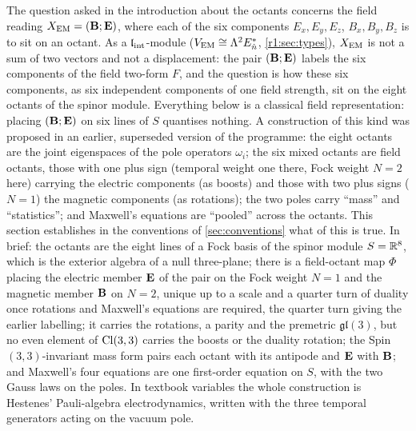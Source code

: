 The question asked in the introduction about the octants concerns the field reading $X_{\rm EM}=(\mathbf B;\mathbf E)$, where each of the six components
$E_x,E_y,E_z$, $B_x,B_y,B_z$ is to sit on an octant. As a $\mathfrak l_{\rm int}$-module ($V_{\rm EM}\cong\Lambda^2E_{\hat n}^*$, \cref{r1:sec:types}), $X_{\rm EM}$ is not a sum
of two vectors and not a displacement: the pair $(\mathbf B;\mathbf E)$ labels the six components of the field two-form $F$, and the question is how
these six components, as six independent components of one field strength, sit on the eight octants of the spinor module. Everything below
is a classical field representation: placing $(\mathbf B;\mathbf E)$ on six lines of $S$ quantises nothing. A construction of this kind was proposed in an earlier, superseded version of the programme: the eight octants are the joint
eigenspaces of the pole operators $\omega_i$; the six mixed octants are field octants, those with one plus sign (temporal weight one
there, Fock weight $N=2$ here) carrying the electric components (as boosts) and those with two plus signs ($N=1$) the magnetic
components (as rotations); the two poles carry ``mass'' and
``statistics''; and Maxwell's equations are ``pooled'' across the octants. This section establishes in the conventions of \cref{sec:conventions} what of this is true. In brief: the octants are the eight lines of a Fock basis of the spinor module $S=\mathbb{R}^8$, which is the exterior
algebra of a null three-plane; there is a field-octant map $\Phi$ placing the electric member $\mathbf E$ of the pair on the Fock weight $N=1$ and the magnetic member $\mathbf B$ on $N=2$, unique up to
a scale and a quarter turn of duality once rotations and Maxwell's equations are required, the quarter turn giving the earlier
labelling; it carries the rotations, a parity and the
premetric $\mathfrak{gl}(3)$, but no even element of $\mathrm{Cl}(3,3)$ carries the boosts or the duality rotation; the Spin$(3,3)$-invariant mass
form pairs each octant with its antipode and $\mathbf E$ with $\mathbf B$; and Maxwell's four equations are one first-order equation on $S$, with the
two Gauss laws on the poles. In textbook variables the whole construction is Hestenes' Pauli-algebra electrodynamics, written with
the three temporal generators acting on the vacuum pole.

